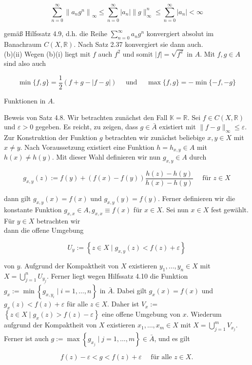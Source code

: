 \documentclass[10pt, letterpaper]{article}
\begin{document}
$$
\sum_{n=0}^{\infty}\left\|a_{n} g^{n}\right\|_{\infty} \leq \sum_{n=0}^{\infty}\left|a_{n}\right|\|g\|_{\infty}^{n} \leq \sum_{n=0}^{\infty}\left|a_{n}\right|<\infty
$$

gemäß Hilfssatz 4.9, d.h. die Reihe $\sum_{n=0}^{\infty} a_{n} g^{n}$ konvergiert absolut im Banachraum $C(X, \mathbb{R})$. Nach Satz 2.37 konvergiert sie dann auch.\\
(b)(ii) Wegen (b)(i) liegt mit $f$ auch $f^{2}$ und somit $|f|=\sqrt{f^{2}}$ in $A$. Mit $f, g \in A$ sind also auch

$$
\min \{f, g\}=\frac{1}{2}(f+g-|f-g|) \quad \text { und } \quad \max \{f, g\}=-\min \{-f,-g\}
$$

Funktionen in $A$.

Beweis von Satz 4.8. Wir betrachten zunächst den Fall $\mathbb{K}=\mathbb{R}$. Sei $f \in C(X, \mathbb{R})$ und $\varepsilon>0$ gegeben. Es reicht, zu zeigen, dass $g \in \bar{A}$ existiert mit $\|f-g\|_{\infty} \leq \varepsilon$. Zur Konstruktion der Funktion $g$ betrachten wir zunächst beliebige $x, y \in X$ mit $x \neq y$. Nach Voraussetzung existiert eine Funktion $h=h_{x, y} \in A$ mit $h(x) \neq h(y)$. Mit dieser Wahl definieren wir nun $g_{x, y} \in A$ durch

$$
g_{x, y}(z):=f(y)+(f(x)-f(y)) \frac{h(z)-h(y)}{h(x)-h(y)} \quad \text { für } z \in X
$$

dann gilt $g_{x, y}(x)=f(x)$ und $g_{x, y}(y)=f(y)$. Ferner definieren wir die konstante Funktion $g_{x, x} \in A, g_{x, x} \equiv f(x)$ für $x \in X$. Sei nun $x \in X$ fest gewählt. Für $y \in X$ betrachten wir\\
dann die offene Umgebung

$$
U_{y}:=\left\{z \in X \mid g_{x, y}(z)<f(z)+\varepsilon\right\}
$$

von $y$. Aufgrund der Kompaktheit von $X$ existieren $y_{1}, \ldots, y_{n} \in X$ mit $X=\bigcup_{j=1}^{n} U_{\underline{y_{j}}}$. Ferner liegt wegen Hilfssatz 4.10 die Funktion $g_{x}:=\min \left\{g_{x, y_{i}} \mid i=1, \ldots, n\right\}$ in $\bar{A}$. Dabei gilt $g_{x}(x)=f(x)$ und $g_{x}(z)<f(z)+\varepsilon$ für alle $z \in X$. Daher ist $V_{x}:=$ $\left\{z \in X \mid g_{x}(z)>f(z)-\varepsilon\right\}$ eine offene Umgebung von $x$. Wiederum aufgrund der Kompaktheit von $X$ existieren $x_{1}, \ldots, x_{m} \in X$ mit $X=\bigcup_{j=1}^{m} V_{x_{j}}$. Ferner ist auch $g:=\max \left\{g_{x_{j}} \mid j=1, \ldots, m\right\} \in \bar{A}$, und es gilt

$$
f(z)-\varepsilon<g<f(z)+\varepsilon \quad \text { für alle } z \in X .
$$
\end{document}
